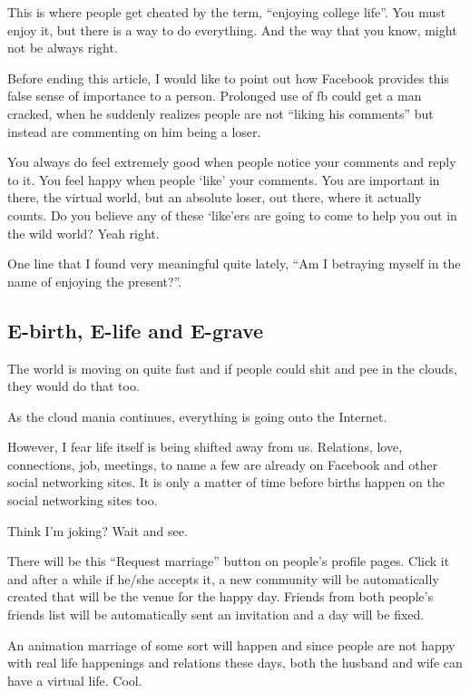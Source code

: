 \documentclass[twoside,11pt,titlepage]{article}
\begin{document}
This is where people get cheated by the term, ``enjoying college life''. You must enjoy it, but there is a way to do everything. And the way that you know, might not be always right.

Before ending this article, I would like to point out how Facebook provides this false sense of importance to a person. Prolonged use of fb could get a man cracked, when he suddenly realizes people are not ``liking his comments'' but instead are commenting on him being a loser.

You always do feel extremely good when people notice your comments and reply to it. You feel happy when people `like' your comments. You are important in there, the virtual world, but an absolute loser, out there, where it actually counts. Do you believe any of these `like'ers are going to come to help you out in the wild world? Yeah right.

One line that I found very meaningful quite lately, ``Am I betraying myself in the name of enjoying the present?''.

\newpage
\begin{center}
  \section{E-birth, E-life and E-grave}
\end{center}
\bigskip
\bigskip
\bigskip

The world is moving on quite fast and if people could shit and pee in the clouds, they would do that too.

As the cloud mania continues, everything is going onto the Internet.

However, I fear life itself is being shifted away from us. Relations, love, connections, job, meetings, to name a few are already on Facebook and other social networking sites. It is only a matter of time before births happen on the social networking sites too.

Think I'm joking? Wait and see.

There will be this ``Request marriage'' button on people's profile pages. Click it and after a while if he/she accepts it, a new community will be automatically created that will be the venue for the happy day. Friends from both people's friends list will be automatically sent an invitation and a day will be fixed.

An animation marriage of some sort will happen and since people are not happy with real life happenings and relations these days, both the husband and wife can have a virtual life. Cool.
\end{document}
